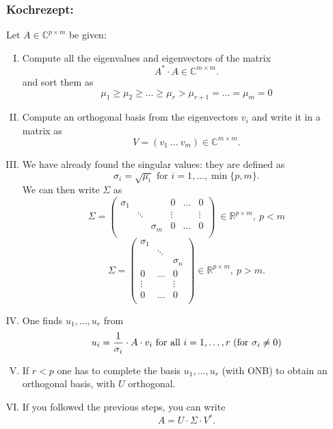 \documentclass[a4paper,12 pt]{article}
\numberwithin{equation}{section}
\theoremstyle{definition}
\theoremstyle{remark}
\theoremstyle{definition}
\theoremstyle{definition}
\theoremstyle{definition}
\theoremstyle{remark}
\begin{document}
\subsubsection*{Kochrezept:}
Let  $A \in \mathbb{C}^{p\times m}$ be given:
\begin{enumerate}[(I)]
\item Compute all the eigenvalues and eigenvectors of the matrix 
$$A^*\cdot A  \in \mathbb{C}^{m\times m}.$$
and sort them as
\begin{equation}
\mu_1\geq \mu_2\geq \hdots \geq \mu_r>\mu_{r+1}=\hdots=\mu_m=0
\end{equation}
\item Compute an orthogonal basis from the eigenvectors $v_i$ and write it in a matrix as
\begin{equation}
V=(v_1\ \hdots \ v_m) \in \mathbb{C}^{m\times m}.
\end{equation}
\item We have already found the singular values: they are defined as
\begin{equation}
\sigma_i=\sqrt{\mu_i}
\text{ for } i=1,\hdots,\min\{p,m\}.
\end{equation}
We can then write $\Sigma $ as
\begin{equation}
\Sigma=\begin{pmatrix}
\sigma_1&&&0&\hdots&0 \\
&\ddots&&\vdots&&\vdots \\
&&\sigma_m&0&\hdots&0 \\
\end{pmatrix}\ \in \mathbb{R}^{p\times m},\ p<m
\end{equation}
\begin{equation}
\Sigma=\begin{pmatrix}
\sigma_1&&\\
&\ddots&\\
&&\sigma_n\\
0&\hdots&0\\
\vdots&&\vdots\\
0&\hdots&0\\
\end{pmatrix} \in \mathbb{R}^{p\times m},\ p>m.
\end{equation}
\item One finds $u_1,\hdots,u_r$ from \begin{equation}
u_i={1\over \sigma_i}\cdot A\cdot v_i \text{ for all } i=1,\hdots,r \text{ (for } \sigma_i\neq0)
\end{equation}
\item If $r<p$ one has to complete the basis  $u_1,\hdots,u_r$ (with ONB) to obtain an orthogonal basis, with $U$ orthogonal.
\item If you followed the previous steps, you can write
$$A=U\cdot \Sigma \cdot V^*.$$
\end{enumerate}
\end{document}
